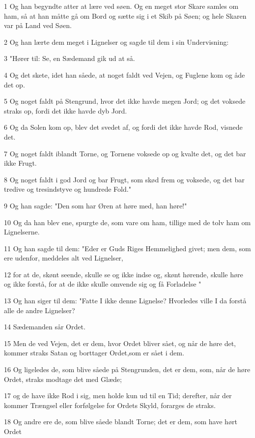 \par 1 Og han begyndte atter at lære ved søen. Og en meget stor Skare samles om ham, så at han måtte gå om Bord og sætte sig i et Skib på Søen; og hele Skaren var på Land ved Søen.
\par 2 Og han lærte dem meget i Lignelser og sagde til dem i sin Undervisning:
\par 3 "Hører til: Se, en Sædemand gik ud at så.
\par 4 Og det skete, idet han såede, at noget faldt ved Vejen, og Fuglene kom og åde det op.
\par 5 Og noget faldt på Stengrund, hvor det ikke havde megen Jord; og det voksede straks op, fordi det ikke havde dyb Jord.
\par 6 Og da Solen kom op, blev det svedet af, og fordi det ikke havde Rod, visnede det.
\par 7 Og noget faldt iblandt Torne, og Tornene voksede op og kvalte det, og det bar ikke Frugt.
\par 8 Og noget faldt i god Jord og bar Frugt, som skød frem og voksede, og det bar tredive og tresindstyve og hundrede Fold."
\par 9 Og han sagde: "Den som har Øren at høre med, han høre!"
\par 10 Og da han blev ene, spurgte de, som vare om ham, tillige med de tolv ham om Lignelserne.
\par 11 Og han sagde til dem: "Eder er Guds Riges Hemmelighed givet; men dem, som ere udenfor, meddeles alt ved Lignelser,
\par 12 for at de, skønt seende, skulle se og ikke indse og, skønt hørende, skulle høre og ikke forstå, for at de ikke skulle omvende sig og få Forladelse "
\par 13 Og han siger til dem: "Fatte I ikke denne Lignelse? Hvorledes ville I da forstå alle de andre Lignelser?
\par 14 Sædemanden sår Ordet.
\par 15 Men de ved Vejen, det er dem, hvor Ordet bliver sået, og når de høre det, kommer straks Satan og borttager Ordet,som er sået i dem.
\par 16 Og ligeledes de, som blive såede på Stengrunden, det er dem, som, når de høre Ordet, straks modtage det med Glæde;
\par 17 og de have ikke Rod i sig, men holde kun ud til en Tid; derefter, når der kommer Trængsel eller forfølgelse for Ordets Skyld, forarges de straks.
\par 18 Og andre ere de, som blive såede blandt Torne; det er dem, som have hørt Ordet

